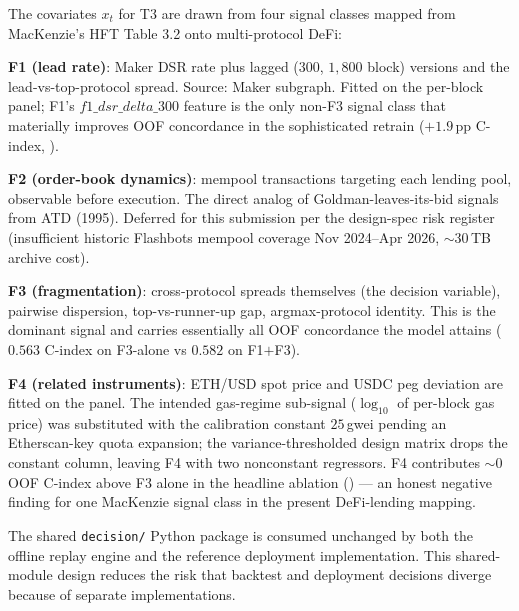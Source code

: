 The covariates $x_t$ for T3 are drawn from four signal classes
mapped from MacKenzie's HFT Table 3.2 \cite{mackenzie2021} onto
multi-protocol DeFi:

\textbf{F1 (lead rate)}: Maker DSR rate plus lagged ($300$, $1{,}800$
block) versions and the lead-vs-top-protocol spread.  Source:
Maker subgraph.  Fitted on the per-block panel; F1's
$f1\_dsr\_delta\_300$ feature is the only non-F3 signal class that
materially improves OOF concordance in the sophisticated retrain
($+1.9$\,pp C-index, ).

\textbf{F2 (order-book dynamics)}: mempool transactions targeting
each lending pool, observable before execution.  The direct
analog of Goldman-leaves-its-bid signals from ATD (1995).
Deferred for this submission per the design-spec risk register
(insufficient historic Flashbots mempool coverage
Nov 2024--Apr 2026, $\sim 30$\,TB archive cost).

\textbf{F3 (fragmentation)}: cross-protocol spreads themselves
(the decision variable), pairwise dispersion, top-vs-runner-up
gap, argmax-protocol identity.  This is the dominant signal and
carries essentially all OOF concordance the model attains
($0.563$ C-index on F3-alone vs $0.582$ on F1$+$F3).

\textbf{F4 (related instruments)}: ETH/USD spot price and
USDC peg deviation are fitted on the panel.  The intended gas-regime
sub-signal ($\log_{10}$ of per-block gas price) was substituted with
the calibration constant $25$\,gwei pending an Etherscan-key quota
expansion; the variance-thresholded design matrix drops the constant
column, leaving F4 with two nonconstant regressors.  F4 contributes $\sim 0$
OOF C-index above F3 alone in the headline ablation ()
--- an honest negative finding for one MacKenzie signal class in
the present DeFi-lending mapping.

The shared \texttt{decision/} Python package is consumed unchanged
by both the offline replay engine and the reference deployment
implementation.  This shared-module design reduces the risk that
backtest and deployment decisions diverge because of separate
implementations.
